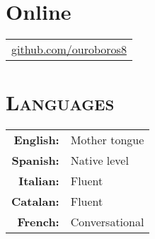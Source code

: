 \documentclass[a4paper,10pt]{article} %
\newcommand*{\justifyheading}{\raggedright}
\begin{document}
\begin{minipage}[t]{0.75\textwidth}
\section{Online}
\smallskip
\begin{tabular}{l}
\href{https://github.com/ouroboros8}{github.com/ouroboros8}
\end{tabular}
\end{minipage}\hspace{-0.01\textwidth}
%
%
\begin{minipage}[t]{0.25\textwidth}
\renewcommand{\justifyheading}{\raggedleft}
\section{\textsc{Languages}}
\smallskip
\begin{tabular}{rl}
 \textbf{English:} & Mother tongue  \\

 \textbf{Spanish:} & Native level  \\

 \textbf{Italian:} & Fluent  \\

 \textbf{Catalan:} & Fluent  \\

 \textbf{French:}  & Conversational
\end{tabular}
\end{minipage}
\end{document}
